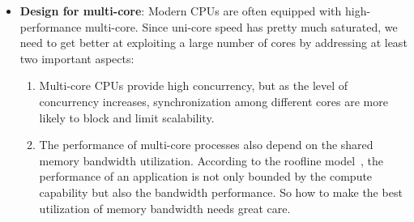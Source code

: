 \begin{itemize}
    \item \textbf{Design for multi-core}: Modern CPUs are often equipped with high-performance multi-core. Since uni-core speed has pretty much saturated, we need to get better at exploiting a large number of cores by addressing at least two important aspects:
    \begin{enumerate}
        \item Multi-core CPUs provide high concurrency, but as the level of concurrency increases, synchronization among different cores are more likely to block and limit scalability.
        \item The performance of multi-core processes also depend on the shared memory bandwidth utilization. According to the roofline model~\cite{roofline},  the performance of an application is not only bounded by the compute capability but also the bandwidth performance. So how to make the best utilization of memory bandwidth needs great care.
    \end{enumerate} 
    

\end{itemize}

